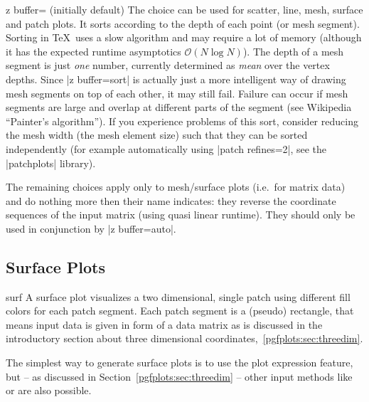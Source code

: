 {\begin{pgfplotskey}{z buffer= (initially default)}
	The choice  can be used for scatter, line, mesh, surface and patch plots. It sorts according to the depth of each point (or mesh segment). Sorting in \TeX\ uses a slow algorithm and may require a lot of memory (although it has the expected runtime asymptotics $\mathcal O(N \log N)$). The depth of a mesh segment is just \emph{one} number, currently determined as \emph{mean} over the vertex depths. Since |z buffer=sort| is actually just a more intelligent way of drawing mesh segments on top of each other, it may still fail. Failure can occur if mesh segments are large and overlap at different parts of the segment (see Wikipedia ``Painter's algorithm''). If you experience problems of this sort, consider reducing the mesh width (the mesh element size) such that they can be sorted independently (for example automatically using |patch refines=2|, see the |patchplots| library).

	The remaining choices apply only to mesh/surface plots (i.e.\ for matrix data) and do nothing more then their name indicates: they reverse the coordinate sequences of the input matrix (using quasi linear runtime). They should only be used in conjunction by |z buffer=auto|.
\end{pgfplotskey}

\subsection{Surface Plots}
\label{sec:pgfplots:surfplots}
\begin{plottype}[/pgfplots]{surf}
	A surface plot visualizes a two dimensional, single patch using different fill colors for each patch segment. Each patch segment is a (pseudo) rectangle, that means input data is given in form of a data matrix as is discussed in the introductory section about three dimensional coordinates,~\ref{pgfplots:sec:threedim}.

\pgfplotsexpensiveexample
\begin{codeexample}[]
\end{codeexample}

	The simplest way to generate surface plots is to use the plot expression feature, but -- as discussed in Section~\ref{pgfplots:sec:threedim} -- other input methods like  or  are also possible. 


\end{plottype}}
